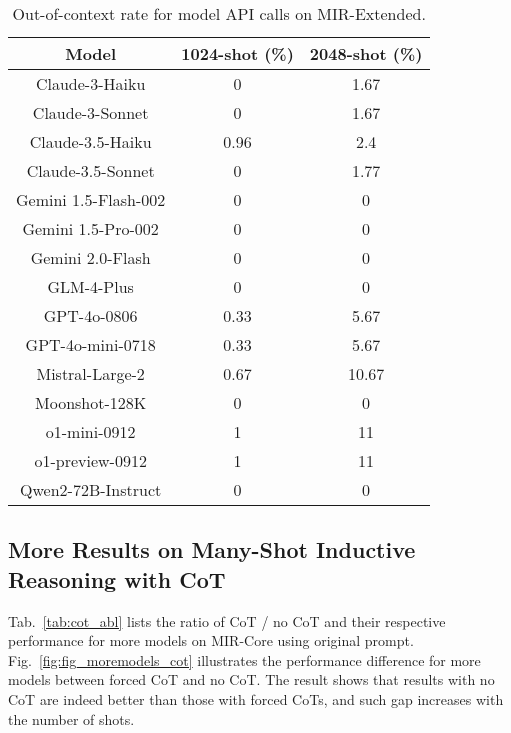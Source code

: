 \begin{table}[ht]
    \caption{Out-of-context rate for model API calls on MIR-Extended.}
    \centering
    \begin{tabular}{ccc}
         \toprule
         Model & 1024-shot (\%)& 2048-shot (\%) \\
         \midrule
         Claude-3-Haiku & 0 & 1.67\\
         Claude-3-Sonnet & 0 & 1.67\\
         Claude-3.5-Haiku & 0.96 & 2.4\\
         Claude-3.5-Sonnet & 0 & 1.77\\
         Gemini 1.5-Flash-002 & 0 & 0\\
         Gemini 1.5-Pro-002 & 0 & 0\\
         Gemini 2.0-Flash & 0 & 0\\
         GLM-4-Plus & 0 & 0\\
         GPT-4o-0806 & 0.33 & 5.67\\
         GPT-4o-mini-0718 & 0.33 & 5.67\\
         Mistral-Large-2 & 0.67 & 10.67\\
         Moonshot-128K & 0 & 0\\
         o1-mini-0912 & 1 & 11\\
         o1-preview-0912 & 1 & 11\\
         Qwen2-72B-Instruct & 0 & 0\\
         \bottomrule
    \end{tabular}
    
    \label{tab:error}
\end{table}

\subsection{More Results on Many-Shot Inductive Reasoning with CoT}
\label{sec:cot_abl}

Tab.~\ref{tab:cot_abl} lists the ratio of CoT / no CoT and their respective performance for more models on MIR-Core using original prompt. Fig.~\ref{fig:fig_moremodels_cot} illustrates the performance difference for more models between forced CoT and no CoT. The result shows that results with no CoT are indeed better than those with forced CoTs, and such gap increases with the number of shots.


